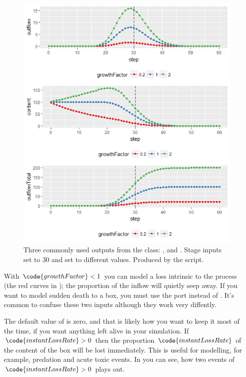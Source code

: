 \begin{figure} [ht]
\centering
\includegraphics[width=.9\textwidth]{graphics/phys-dev-2}
\caption{Three commonly used outputs from the  class: ,  and . Stage inputs  set to 30 and  set to different values. Produced by the  script.}
\label{fig:phys-dev-2}
\end{figure}

With $\code{growthFactor}<1$ you can model a loss intrinsic to the process (the red curves in ); the  proportion of the inflow will quietly seep away. If you want to model sudden death to a  box, you must use the  port instead of . It's common to confuse these two inputs although they work very diffently.

The default value of  is zero, and that is likely how you want to keep it most of the time, if you want anything left alive in your simulation. If $\code{instantLossRate}>0$ then the proportion $\code{instantLossRate}$ of the content of the  box will be lost immediately. This is useful for modelling, for example, predation and acute toxic events. In  you can see, how two events of $\code{instantLossRate}>0$ plays out.

